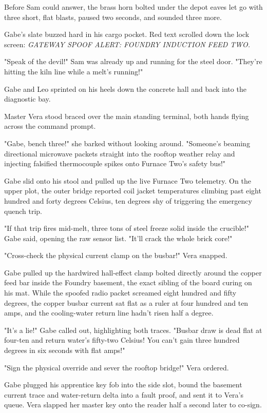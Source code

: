 Before Sam could answer, the brass horn bolted under the depot eaves let go with three short, flat blasts, paused two seconds, and sounded three more.

Gabe's slate buzzed hard in his cargo pocket. Red text scrolled down the lock screen: \textit{GATEWAY SPOOF ALERT: FOUNDRY INDUCTION FEED TWO.}

"Speak of the devil!" Sam was already up and running for the steel door. "They're hitting the kiln line while a melt's running!"

Gabe and Leo sprinted on his heels down the concrete hall and back into the diagnostic bay.

Master Vera stood braced over the main standing terminal, both hands flying across the command prompt.

"Gabe, bench three!" she barked without looking around. "Someone's beaming directional microwave packets straight into the rooftop weather relay and injecting falsified thermocouple spikes onto Furnace Two's safety bus!"

Gabe slid onto his stool and pulled up the live Furnace Two telemetry. On the upper plot, the outer bridge reported coil jacket temperatures climbing past eight hundred and forty degrees Celsius, ten degrees shy of triggering the emergency quench trip.

"If that trip fires mid-melt, three tons of steel freeze solid inside the crucible!" Gabe said, opening the raw sensor list. "It'll crack the whole brick core!"

"Cross-check the physical current clamp on the busbar!" Vera snapped.

Gabe pulled up the hardwired hall-effect clamp bolted directly around the copper feed bar inside the Foundry basement, the exact sibling of the board curing on his mat. While the spoofed radio packet screamed eight hundred and fifty degrees, the copper busbar current sat flat as a ruler at four hundred and ten amps, and the cooling-water return line hadn't risen half a degree.

"It's a lie!" Gabe called out, highlighting both traces. "Busbar draw is dead flat at four-ten and return water's fifty-two Celsius! You can't gain three hundred degrees in six seconds with flat amps!"

"Sign the physical override and sever the rooftop bridge!" Vera ordered.

Gabe plugged his apprentice key fob into the side slot, bound the basement current trace and water-return delta into a fault proof, and sent it to Vera's queue. Vera slapped her master key onto the reader half a second later to co-sign.

